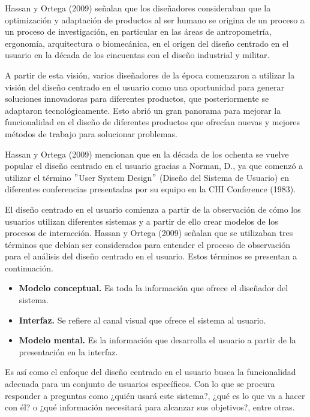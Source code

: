 Hassan y Ortega (2009) señalan que los diseñadores consideraban que la optimización y adaptación de productos al ser humano  se origina de un proceso a un proceso de investigación, en particular en las áreas de antropometría, ergonomía, arquitectura o biomecánica, en el origen del diseño centrado en el usuario en la década de los cincuentas con el diseño industrial y militar.

A partir de esta visión, varios diseñadores de la época comenzaron a utilizar la visión del diseño centrado en el usuario como una oportunidad para generar soluciones innovadoras para diferentes productos, que posteriormente se adaptaron tecnológicamente. Esto abrió un gran panorama para mejorar la funcionalidad en el diseño de diferentes productos que ofrecían nuevas y mejores métodos de trabajo para solucionar problemas.

Hassan y Ortega (2009) mencionan que en la década de los ochenta se vuelve popular el diseño centrado en el usuario gracias a Norman, D., ya que comenzó a utilizar el término $"$User System Design$"$ (Diseño del Sistema de Usuario) en diferentes conferencias presentadas por su equipo en la CHI Conference (1983).

El diseño centrado en el usuario comienza a partir de la observación de cómo los usuarios utilizan diferentes sistemas y a partir de ello crear modelos de los procesos de interacción. Hassan y Ortega (2009) señalan que se utilizaban tres términos que debían ser considerados para entender el proceso de observación para el análisis del diseño centrado en el usuario. Estos términos se presentan a continuación.

\begin{itemize}
  \item \textbf{Modelo conceptual.} Es toda la información que ofrece el diseñador del sistema.
  \item \textbf{Interfaz.} Se refiere al canal visual que ofrece el sistema al usuario.
  \item \textbf{Modelo mental.} Es la información que desarrolla el usuario a partir de la presentación en la interfaz.
\end{itemize}

Es así como el enfoque del diseño centrado en el usuario busca la funcionalidad adecuada para un conjunto de usuarios específicos. Con lo que se procura responder a preguntas como ¿quién usará este sistema?, ¿qué es lo que va a hacer con él? o ¿qué información necesitará para alcanzar sus objetivos?, entre otras.

